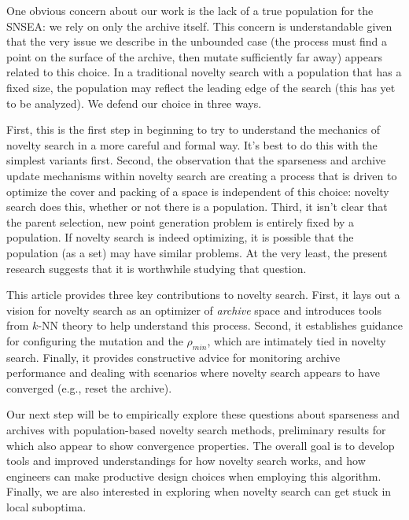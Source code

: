 \documentclass[twoside]{article}
\begin{document}
One obvious concern about our work is the lack of a true population for the SNSEA: we rely on only the archive itself.  This concern is understandable given that the very issue we describe in the unbounded case (the process must find a point on the surface of the archive, then mutate sufficiently far away) appears related to this choice.  In a traditional novelty search with a population that has a fixed size, the population may reflect the leading edge of the search (this has yet to be analyzed).  We defend our choice in three ways.

First, this is the first step in beginning to try to understand the mechanics of novelty search in a more careful and formal way.  It's best to do this with the simplest variants first.  Second, the observation that the sparseness and archive update mechanisms within novelty search are creating a process that is driven to optimize the cover and packing of a space is independent of this choice:  novelty search does this, whether or not there is a population.  Third, it isn't clear that the parent selection, new point generation problem is entirely fixed by a population.  If novelty search is indeed optimizing, it is possible that the population (as a set) may have similar problems.  At the very least, the present research suggests that it is worthwhile studying that question.

This article provides three key contributions to novelty search.  First, it lays out a  vision for novelty search as an optimizer of \emph{archive} space and introduces tools from $k$-NN theory to help understand this process.  Second, it establishes guidance for configuring the mutation and the $\rho_{min}$, which are intimately tied in novelty search.  Finally, it provides constructive advice for monitoring archive performance and dealing with scenarios where novelty search appears to have converged (e.g., reset the archive).  

Our next step will be to empirically explore these questions about sparseness and archives with population-based novelty search methods, preliminary results for which also appear to show convergence properties.  
The overall goal is to develop tools and improved understandings for how novelty search works, and how engineers can make productive design choices when employing this algorithm.  Finally, we are also interested in exploring when novelty search can get stuck in local suboptima.

\small



\end{document}
